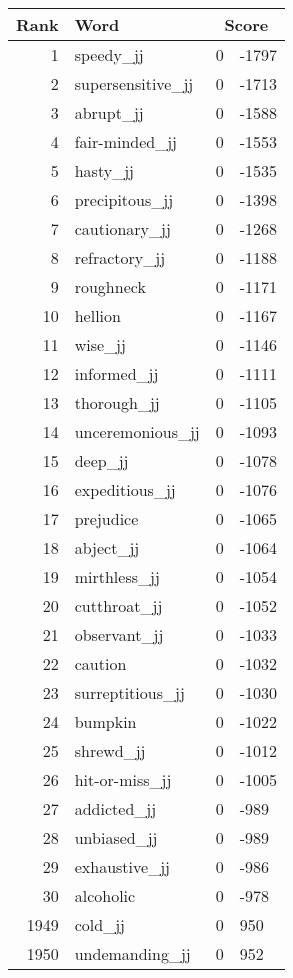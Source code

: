 \begin{longtable}[!htbp]{| rlr@{.}l |}
    \hline
    \textbf{Rank} & \textbf{Word} & \multicolumn{2}{c|}{\textbf{Score}} \\
    \hline
    \endhead
    1 & speedy\_jj & 0 & -1797 \\
    2 & supersensitive\_jj & 0 & -1713 \\
    3 & abrupt\_jj & 0 & -1588 \\
    4 & fair-minded\_jj & 0 & -1553 \\
    5 & hasty\_jj & 0 & -1535 \\
    6 & precipitous\_jj & 0 & -1398 \\
    7 & cautionary\_jj & 0 & -1268 \\
    8 & refractory\_jj & 0 & -1188 \\
    9 & roughneck & 0 & -1171 \\
    10 & hellion & 0 & -1167 \\
    11 & wise\_jj & 0 & -1146 \\
    12 & informed\_jj & 0 & -1111 \\
    13 & thorough\_jj & 0 & -1105 \\
    14 & unceremonious\_jj & 0 & -1093 \\
    15 & deep\_jj & 0 & -1078 \\
    16 & expeditious\_jj & 0 & -1076 \\
    17 & prejudice & 0 & -1065 \\
    18 & abject\_jj & 0 & -1064 \\
    19 & mirthless\_jj & 0 & -1054 \\
    20 & cutthroat\_jj & 0 & -1052 \\
    21 & observant\_jj & 0 & -1033 \\
    22 & caution & 0 & -1032 \\
    23 & surreptitious\_jj & 0 & -1030 \\
    24 & bumpkin & 0 & -1022 \\
    25 & shrewd\_jj & 0 & -1012 \\
    26 & hit-or-miss\_jj & 0 & -1005 \\
    27 & addicted\_jj & 0 & -989 \\
    28 & unbiased\_jj & 0 & -989 \\
    29 & exhaustive\_jj & 0 & -986 \\
    30 & alcoholic & 0 & -978 \\
    1949 & cold\_jj & 0 & 950 \\
    1950 & undemanding\_jj & 0 & 952 \\

\end{longtable}
